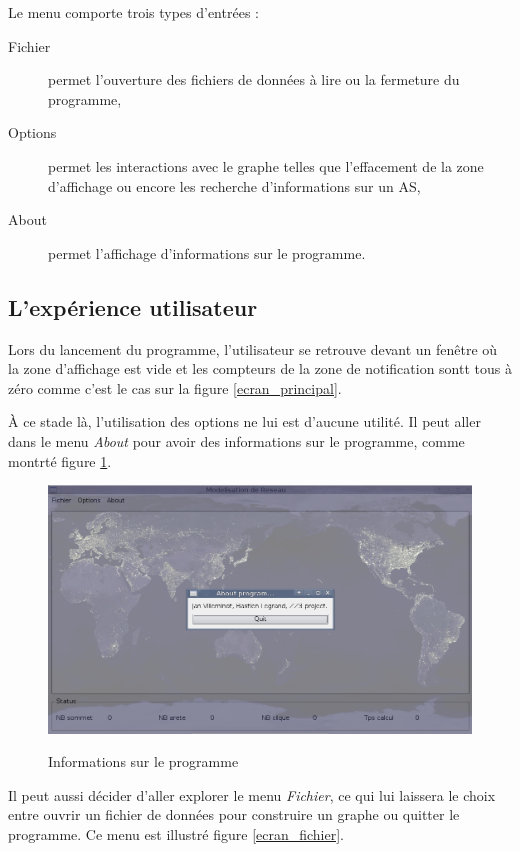 Le menu comporte trois types d'entr\'ees :
\begin{description}
 \item[Fichier] permet l'ouverture des fichiers de donn\'ees \`a lire ou la fermeture du programme,
 \item[Options] permet les interactions avec le graphe telles que l'effacement de la zone d'affichage ou encore les recherche d'informations sur un AS,
 \item[About] permet l'affichage d'informations sur le programme.
\end{description}

\subsection{L'exp\'erience utilisateur}
\par
Lors du lancement du programme, l'utilisateur se retrouve devant un fen\^etre o\`u la zone d'affichage est vide et les compteurs de la zone de notification sontt tous \`a z\'ero comme c'est le cas sur la figure \ref{ecran_principal}.
\par
\`A ce stade l\`a, l'utilisation des options ne lui est d'aucune utilit\'e. Il peut aller dans le menu \textit{About} pour avoir des informations sur le programme, comme montrt\'e figure \ref{ecran_about}.

\begin{figure}[ht]
\centering
 \fbox
 {
 \includegraphics[width=16cm]{./schema/capture_ecran_about.png}
 }
  \caption{\label{ecran_about}Informations sur le programme}
\end{figure}

\par
Il peut aussi d\'ecider d'aller explorer le menu \textit{Fichier}, ce qui lui laissera le choix entre ouvrir un fichier de donn\'ees pour construire un graphe ou quitter le programme. Ce menu est illustr\'e figure \ref{ecran_fichier}.

